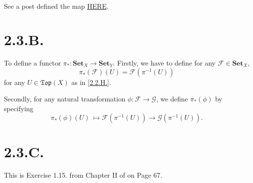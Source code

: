 See a post defined the map \href{https://math.stackexchange.com/questions/1387214/the-induced-map-on-stalks-is-well-defined}{HERE}.

\section{2.3.B.}
To define a functor $\pi_{\ast}:\textbf{Set}_X\to\textbf{Set}_Y$.
Firstly, we have to define for any $\mathscr F\in \textbf{Set}_X$, 
\[\pi_{\ast}(\mathscr F)(U)=\mathscr F(\pi^{-1}(U))\] for any $U\in \mathfrak{Top}(X)$ as in \ref{2.2.H.}. 

Secondly, for any natural transformation $\phi:\mathscr F\to\mathscr G$, we define $\pi_{\ast}(\phi)$ by specifying 
\[\pi_{\ast}(\phi)(U) ~\mapsto \mathscr F(\pi^{-1}(U))\to\mathscr G(\pi^{-1}(U)).\]

\section{2.3.C.}\label{2.3.C.}

This is Exercise 1.15. from Chapter II of \cite{hartshorne2013algebraic} on Page 67.

